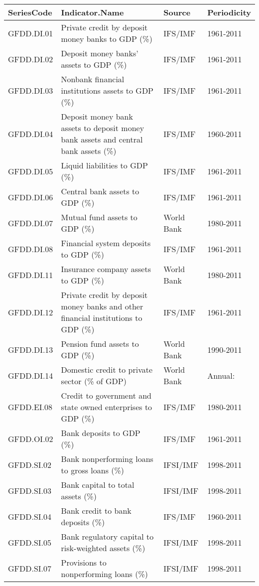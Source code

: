 {\scriptsize
\begin{tabular}{llll}
  \hline
SeriesCode & Indicator.Name & Source & Periodicity \\ 
  \hline
GFDD.DI.01 & Private credit by deposit money banks to GDP (\%) & IFS/IMF & 1961-2011 \\ 
  GFDD.DI.02 & Deposit money banks' assets to GDP (\%) & IFS/IMF & 1961-2011 \\ 
  GFDD.DI.03 & Nonbank financial institutions assets to GDP (\%) & IFS/IMF & 1961-2011 \\ 
  GFDD.DI.04 & Deposit money bank assets to deposit money bank assets and central bank assets (\%) & IFS/IMF & 1960-2011 \\ 
  GFDD.DI.05 & Liquid liabilities to GDP (\%) & IFS/IMF & 1961-2011 \\ 
  GFDD.DI.06 & Central bank assets to GDP (\%) & IFS/IMF & 1961-2011 \\ 
  GFDD.DI.07 & Mutual fund assets to GDP (\%) & World Bank & 1980-2011 \\ 
  GFDD.DI.08 & Financial system deposits to GDP (\%) & IFS/IMF & 1961-2011 \\ 
  GFDD.DI.11 & Insurance company assets to GDP (\%) & World Bank & 1980-2011 \\ 
  GFDD.DI.12 & Private credit by deposit money banks and other financial institutions to GDP (\%) & IFS/IMF & 1961-2011 \\ 
  GFDD.DI.13 & Pension fund assets to GDP (\%) & World Bank & 1990-2011 \\ 
  GFDD.DI.14 & Domestic credit to private sector (\% of GDP) & World Bank & Annual: \\ 
  GFDD.EI.08 & Credit to government and state owned enterprises to GDP (\%) & IFS/IMF & 1980-2011 \\ 
  GFDD.OI.02 & Bank deposits to GDP (\%) & IFS/IMF & 1961-2011 \\ 
  GFDD.SI.02 & Bank nonperforming loans to gross loans (\%) & IFSI/IMF & 1998-2011 \\ 
  GFDD.SI.03 & Bank capital to total assets (\%) & IFSI/IMF & 1998-2011 \\ 
  GFDD.SI.04 & Bank credit to bank deposits (\%) & IFS/IMF & 1960-2011 \\ 
  GFDD.SI.05 & Bank regulatory capital to risk-weighted assets (\%) & IFSI/IMF & 1998-2011 \\ 
  GFDD.SI.07 & Provisions to nonperforming loans (\%) & IFSI/IMF & 1998-2011 \\ 
   \hline
\end{tabular}
}
